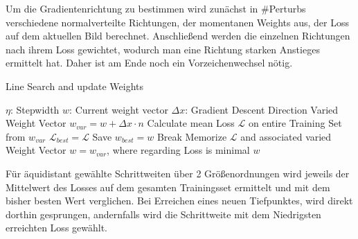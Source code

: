 Um die Gradientenrichtung zu bestimmen wird zunächst in \#Perturbs verschiedene normalverteilte Richtungen, der momentanen Weights aus, der Loss auf dem aktuellen Bild berechnet. Anschließend werden die einzelnen Richtungen nach ihrem Loss gewichtet, wodurch man eine Richtung starken Anstieges ermittelt hat. Daher ist am Ende noch ein Vorzeichenwechsel nötig.

\vspace{1cm}


\begin{algorithm}[H]
\caption{Line Search and update Weights}\label{alg:sgd_ls}
\begin{algorithmic}[1]
	\State $\eta$: Stepwidth
	\State $w$: Current weight vector
	\State $\Delta x$: Gradient Descent Direction
	\State
		\State Varied Weight Vector $w_{var} = w + \Delta x \cdot n$
		\State Calculate mean Loss $\mathcal{L}$ on entire Training Set
		\State from $w_{var}$
			\State $\mathcal{L}_{best} = \mathcal{L}$
			\State Save $w_{best} = w$
			\State Break
		\EndIf
		\State Memorize $\mathcal{L}$ and associated varied Weight Vector
	\EndFor
	\State $w = w_{var}$, where regarding Loss is minimal
	\State \Return $w$
\EndProcedure
\end{algorithmic}
\end{algorithm}

\vspace{0.5cm}

Für äquidistant gewählte Schrittweiten über 2 Größenordnungen wird jeweils der Mittelwert des Losses auf dem gesamten Trainingsset ermittelt und mit dem bisher besten Wert verglichen. Bei Erreichen eines neuen Tiefpunktes, wird direkt dorthin gesprungen, andernfalls wird die Schrittweite mit dem Niedrigsten erreichten Loss gewählt.







